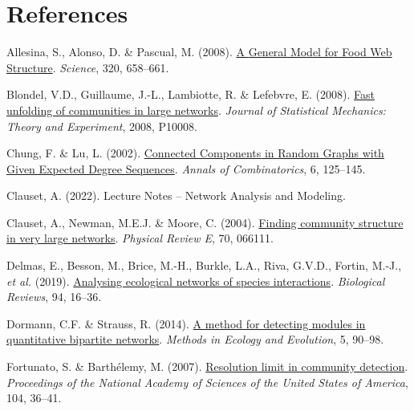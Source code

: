\documentclass[
]{article}
\newlength{\cslhangindent}
\newlength{\cslentryspacingunit} %
\newenvironment{CSLReferences}[2] %
 {%
  \setlength{\parindent}{0pt}
  \ifodd #1
  \let\oldpar\par
  \def\par{\hangindent=\cslhangindent\oldpar}
  \fi
  \setlength{\parskip}{#2\cslentryspacingunit}
 }%
 {}
\begin{document}
\hypertarget{references}{%
\section*{References}\label{references}}

\hypertarget{refs}{}
\begin{CSLReferences}{1}{0}
\leavevmode{}%
Allesina, S., Alonso, D. \& Pascual, M. (2008).
\href{https://doi.org/10.1126/science.1156269}{A {General Model} for
{Food Web Structure}}. \emph{Science}, 320, 658--661.

\leavevmode{}%
Blondel, V.D., Guillaume, J.-L., Lambiotte, R. \& Lefebvre, E. (2008).
\href{https://doi.org/10.1088/1742-5468/2008/10/P10008}{Fast unfolding
of communities in large networks}. \emph{Journal of Statistical
Mechanics: Theory and Experiment}, 2008, P10008.

\leavevmode{}%
Chung, F. \& Lu, L. (2002).
\href{https://doi.org/10.1007/PL00012580}{Connected {Components} in
{Random Graphs} with {Given Expected Degree Sequences}}. \emph{Annals of
Combinatorics}, 6, 125--145.

\leavevmode{}%
Clauset, A. (2022). Lecture {Notes} -- {Network Analysis} and
{Modeling}.

\leavevmode{}%
Clauset, A., Newman, M.E.J. \& Moore, C. (2004).
\href{https://doi.org/10.1103/PhysRevE.70.066111}{Finding community
structure in very large networks}. \emph{Physical Review E}, 70, 066111.

\leavevmode{}%
Delmas, E., Besson, M., Brice, M.-H., Burkle, L.A., Riva, G.V.D.,
Fortin, M.-J., \emph{et al.} (2019).
\href{https://doi.org/10.1111/brv.12433}{Analysing ecological networks
of species interactions}. \emph{Biological Reviews}, 94, 16--36.

\leavevmode{}%
Dormann, C.F. \& Strauss, R. (2014).
\href{https://doi.org/10.1111/2041-210X.12139}{A method for detecting
modules in quantitative bipartite networks}. \emph{Methods in Ecology
and Evolution}, 5, 90--98.

\leavevmode{}%
Fortunato, S. \& Barthélemy, M. (2007).
\href{https://doi.org/10.1073/pnas.0605965104}{Resolution limit in
community detection}. \emph{Proceedings of the National Academy of
Sciences of the United States of America}, 104, 36--41.


\end{CSLReferences}
\end{document}
